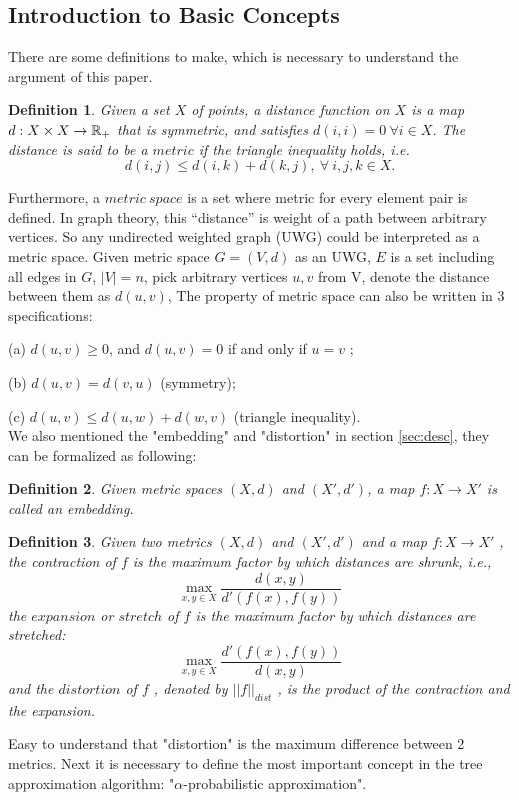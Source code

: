 \documentclass[11pt,twoside, onecolumn]{IEEEtran}
\newtheorem{Definition}{Definition}[section]
\begin{document}
\subsection{Introduction to Basic Concepts}
\label{sec:basic}
There are some definitions to make, which is necessary to understand the argument of this paper.
\begin{Definition}
Given a set $X$ of points, a \emph{distance function} on $X$ is a map $d : X \times X \to \mathbb{R}_+$ that is symmetric,
and satisfies $d(i, i) = 0\ \forall i \in X$. The distance is said to be a $metric$ if the triangle inequality
holds, i.e.
$$d(i, j) \leq d(i, k) + d(k, j),
\ \forall\ i, j, k \in X.$$
\end{Definition}
Furthermore, a $metric\ space$ is a set
where metric for every element pair is defined. In graph theory, this “distance” is weight of a
path between arbitrary vertices. So any undirected weighted graph (UWG) could be interpreted
as a metric space. Given metric space $G = (V, d)$ as an UWG, $E$ is a set including all edges in $G$, $|
V| = n$, pick arbitrary vertices $u, v$ from V, denote the distance between them as $d(u, v)$, The property of metric space can also be written in 3 specifications:\par
(a) $d(u, v) \geq 0$, and $d(u, v) = 0$ if and only if $u = v$ ;\par
(b) $d(u, v) = d(v, u)$ (symmetry);\par
(c) $d(u, v) \leq d(u, w) + d(w, v)$ (triangle inequality).
\\
We also mentioned the "embedding" and "distortion" in section \ref{sec:desc}, they can be formalized as
following:
\begin{Definition}
Given metric spaces $(X, d)$ and $(X', d' )$, a map $f : X \to X'$ is called an \emph{embedding}.
\end{Definition}
\begin{Definition}
Given two metrics $(X, d)$ and $(X' , d' )$ and a map $f : X \to X'$ , the \emph{contraction} of $f$ is the
maximum factor by which distances are shrunk, i.e.,
$$\max_{x,y\in X}\frac{d(x,y)}{d'(f(x),f(y))}$$
the $expansion$ or $stretch$ of $f$ is the maximum factor by which distances are stretched:
$$\max_{x,y\in X}\frac{d'(f(x),f(y))}{d(x,y)}$$
and the $distortion$ of $f$ , denoted by $||f||_{dist}$ , is the product of the contraction and the expansion.
\end{Definition}
Easy to understand that "distortion" is the maximum difference between 2 metrics. 
 Next it is necessary to 
define the most important concept in the tree approximation algorithm: "$\alpha$-probabilistic approximation".
\end{document}
